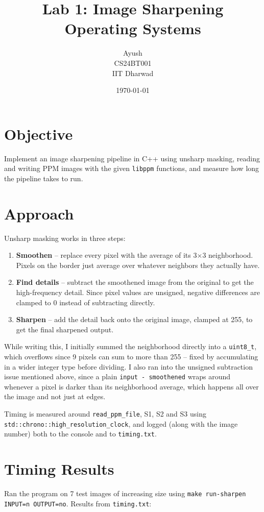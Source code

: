 \documentclass[11pt]{article}
\title{Lab 1: Image Sharpening \\ \large Operating Systems}
\author{Ayush \\ CS24BT001 \\ IIT Dharwad}
\date{\today}
\begin{document}
\maketitle

\section*{Objective}
Implement an image sharpening pipeline in C++ using unsharp masking, reading and
writing PPM images with the given \texttt{libppm} functions, and measure how long
the pipeline takes to run.

\section*{Approach}
Unsharp masking works in three steps:

\begin{enumerate}
	\item \textbf{Smoothen} -- replace every pixel with the average of its
	3$\times$3 neighborhood. Pixels on the border just average over whatever
	neighbors they actually have.
	\item \textbf{Find details} -- subtract the smoothened image from the original
	to get the high-frequency detail. Since pixel values are unsigned, negative
	differences are clamped to 0 instead of subtracting directly.
	\item \textbf{Sharpen} -- add the detail back onto the original image, clamped
	at 255, to get the final sharpened output.
\end{enumerate}

While writing this, I initially summed the neighborhood directly into a
\texttt{uint8\_t}, which overflows since 9 pixels can sum to more than 255 -- fixed
by accumulating in a wider integer type before dividing. I also ran into the
unsigned subtraction issue mentioned above, since a plain \texttt{input -
smoothened} wraps around whenever a pixel is darker than its neighborhood average,
which happens all over the image and not just at edges.


Timing is measured around \texttt{read\_ppm\_file}, S1, S2 and S3 using
\texttt{std::chrono::high\_resolution\_clock}, and logged (along with the image
number) both to the console and to \texttt{timing.txt}.

\section*{Timing Results}
Ran the program on 7 test images of increasing size using
\texttt{make run-sharpen INPUT=n OUTPUT=no}. Results from \texttt{timing.txt}:
\end{document}
